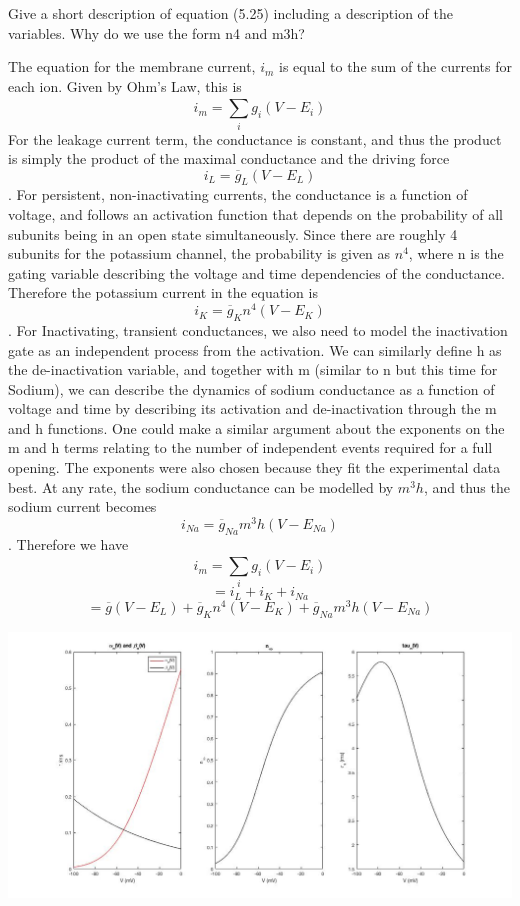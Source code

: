 \documentclass{121Temp}
\begin{document}
\maketitle

\hwproblem
\label{Q1}
Give a short description of equation (5.25) including a description of the variables. Why do we use the
form n4 and m3h?

The equation for the membrane current, $i_m$ is equal to the sum of the currents for each ion. Given by Ohm's Law, this is $$i_m = \sum_{i}^{} g_i(V-E_i)$$
For the leakage current term, the conductance is constant, and thus the product is simply the product of the maximal conductance and the driving force $$i_L = \overline{g}_L(V-E_L)$$. For persistent, non-inactivating currents, the conductance is a function of voltage, and follows an activation function that depends on the probability of all subunits being in an open state simultaneously. Since there are roughly 4 subunits for the potassium channel, the probability is given as $n^4$, where n is the gating variable describing the voltage and time dependencies of the conductance. Therefore the potassium current in the equation is $$i_K = \overline{g}_Kn^4(V-E_K)$$. For Inactivating, transient conductances, we also need to model the inactivation gate as an independent process from the activation. We can similarly define h as the de-inactivation variable, and together with m (similar to n but this time for Sodium), we can describe the dynamics of sodium conductance as a function of voltage and time by describing its activation and de-inactivation through the m and h functions. One could make a similar argument about the exponents on the m and h terms relating to the number of independent events required for a full opening. The exponents were also chosen because they fit the experimental data best. At any rate, the sodium conductance can be modelled by $m^3h$, and thus the sodium current becomes $$i_{Na} = \overline{g}_{Na}m^3h(V-E_{Na})$$. Therefore we have $$i_m = \sum_{i}^{} g_i(V-E_i) $$ $$=i_L + i_K + i_{Na}$$ $$= \overline{g}(V-E_L) + \overline{g}_Kn^4(V-E_K) + \overline{g}_{Na}m^3h(V-E_{Na})$$

\hwproblem
\includegraphics[scale=.35]{59}
\end{document}
